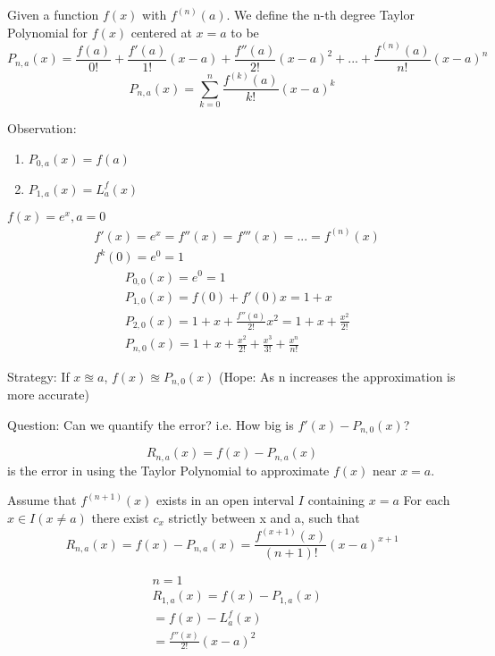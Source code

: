 \begin{defn}
Given a function $f(x)$ with $f^{(n)}(a)$. We define the n-th degree Taylor Polynomial for $f(x)$ centered at $x=a$ to be
\[P_{n,a}(x) = \frac{f(a)}{0!} + \frac{f'(a)}{1!}(x-a) + \frac{f''(a)}{2!}(x-a)^2 + ... + \frac{f^{(n)}(a)}{n!}(x-a)^n\]
\[P_{n,a}(x) = \sum_{k=0}^n \frac{f^{(k)}(a)}{k!}(x-a)^k\]
\end{defn}

Observation:
\begin{enumerate}
    \item $P_{0,a}(x) = f(a)$
    \item $P_{1,a}(x) = L_a^f(x)$
\end{enumerate}

\begin{exmp}
    $f(x) = e^x, a = 0$
    \begin{align*}
        &f'(x) = e^x = f''(x) = f'''(x) = ... = f^{(n)}(x)\\
        &f^{k}(0)=e^0=1
    \end{align*}
    \begin{align*}
        &P_{0,0}(x) = e^0 = 1\\
        &P_{1,0}(x) = f(0) + f'(0)x = 1 + x\\
        &P_{2,0}(x) = 1+x+ \frac{f''(a)}{2!}x^2 = 1 + x + \frac{x^2}{2!}\\
        &P_{n,0}(x) = 1+x+\frac{x^2}{2!}+\frac{x^3}{3!}+\frac{x^n}{n!}
    \end{align*}
\end{exmp}

Strategy:
If $x \approxeq a$, $f(x) \approxeq P_{n,0}(x)$ (Hope: As n increases the approximation is more accurate)

Question: Can we quantify the error? i.e. How big is $f'(x)-P_{n,0}(x)$?


\begin{defn}
\[R_{n,a}(x) = f(x) - P_{n,a}(x)\] is the error in using the Taylor Polynomial to approximate $f(x)$ near $x=a$.
\end{defn}

\begin{thm}
    Assume that $f^{(n+1)}(x)$ exists in an open interval $I$ containing $x = a$ For each $x\in I (x \neq a)$ there exist $c_x$ strictly between x and a, such that
    \[R_{n,a}(x)=f(x)-P_{n,a}(x) = \frac{f^{(x+1)}(x)}{(n+1)!}(x-a)^{x+1}\]
\end{thm}

\begin{exmp}
    \begin{align*}
        &n = 1\\
        &R_{1,a}(x) = f(x) - P_{1,a}(x)\\
        &=f(x) - L_a^f(x)\\
        &=\frac{f''(x)}{2!}(x-a)^2
    \end{align*}
\end{exmp}